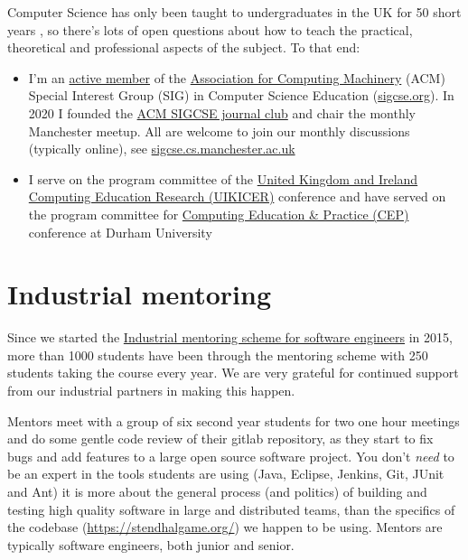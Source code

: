 \documentclass[
  12pt,
]{book}
\providecommand{\tightlist}{%
  \setlength{\itemsep}{0pt}\setlength{\parskip}{0pt}}
\begin{document}
Computer Science has only been taught to undergraduates in the UK for 50 short years \citep{babygrowsup, sigcse50}, so there's lots of open questions about how to teach the practical, theoretical and professional aspects of the subject. To that end:

\begin{itemize}
\tightlist
\item
  I'm an \href{https://dl.acm.org/author_page.cfm?id=81350580198}{active member} of the \href{https://en.wikipedia.org/wiki/Association_for_Computing_Machinery}{Association for Computing Machinery} (ACM) Special Interest Group (SIG) in Computer Science Education (\href{https://sigcse.org}{sigcse.org}). In 2020 I founded the \href{https://sigcse.cs.manchester.ac.uk/}{ACM SIGCSE journal club} and chair the monthly Manchester meetup. All are welcome to join our monthly discussions (typically online), see \href{https://sigcse.cs.manchester.ac.uk/}{sigcse.cs.manchester.ac.uk}
\item
  I serve on the program committee of the \href{https://www.ukicer.com/}{United Kingdom and Ireland Computing Education Research (UIKICER)} conference and have served on the program committee for \href{http://community.dur.ac.uk/cep.conference}{Computing Education \& Practice (CEP)} conference at Durham University
\end{itemize}

\hypertarget{industrial-mentoring}{%
\section{Industrial mentoring}\label{industrial-mentoring}}

Since we started the \href{https://www.cs.manchester.ac.uk/connect/business-engagement/industrial-mentoring/}{Industrial mentoring scheme for software engineers} in 2015, more than 1000 students have been through the mentoring scheme with 250 students taking the course every year. We are very grateful for continued support from our industrial partners in making this happen.

Mentors meet with a group of six second year students for two one hour meetings and do some gentle code review of their gitlab repository, as they start to fix bugs and add features to a large open source software project. You don't \emph{need} to be an expert in the tools students are using (Java, Eclipse, Jenkins, Git, JUnit and Ant) it is more about the general process (and politics) of building and testing high quality software in large and distributed teams, than the specifics of the codebase (\url{https://stendhalgame.org/}) we happen to be using. Mentors are typically software engineers, both junior and senior.
\end{document}
